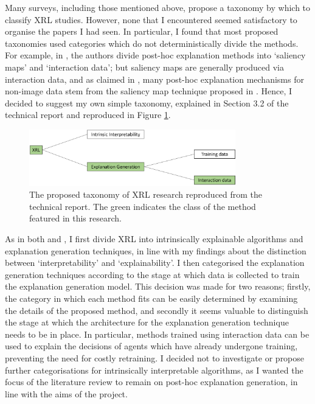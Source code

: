 \documentclass{article}
\begin{document}
Many surveys, including those mentioned above, propose a taxonomy by which to classify XRL studies. However, none that I encountered seemed satisfactory to organise the papers I had seen. In particular, I found that most proposed taxonomies used categories which do not deterministically divide the methods. For example, in \cite{heuillet2021explainability}, the authors divide post-hoc explanation methods into `saliency maps' and `interaction data'; but saliency maps are generally produced via interaction data, and as claimed in \cite{wang2022causal}, many post-hoc explanation mechanisms for non-image data stem from the saliency map technique proposed in \cite{simonyan2013deep}. Hence, I decided to suggest my own simple taxonomy, explained in Section 3.2 of the technical report and reproduced in Figure \ref{fig:xrl_taxonomy}. 

\begin{figure}[htp]
    \centering
    \includegraphics[width=0.8\textwidth]{Images/XRL taxonomy.png}
    \caption{The proposed taxonomy of XRL research reproduced from the technical report. The green indicates the class of the method featured in this research.}
    \label{fig:xrl_taxonomy}
\end{figure}

As in both \cite{glanois2021survey} and \cite{heuillet2021explainability}, I first divide XRL into intrinsically explainable algorithms and explanation generation techniques, in line with my findings about the distinction between `interpretability' and `explainability'. I then categorised the explanation generation techniques according to the stage at which data is collected to train the explanation generation model. This decision was made for two reasons; firstly, the category in which each method fits can be easily determined by examining the details of the proposed method, and secondly it seems valuable to distinguish the stage at which the architecture for the explanation generation technique needs to be in place. In particular, methods trained using interaction data can be used to explain the decisions of agents which have already undergone training, preventing the need for costly retraining. I decided not to investigate or propose further categorisations for intrinsically interpretable algorithms, as I wanted the focus of the literature review to remain on post-hoc explanation generation, in line with the aims of the project. 
\end{document}
